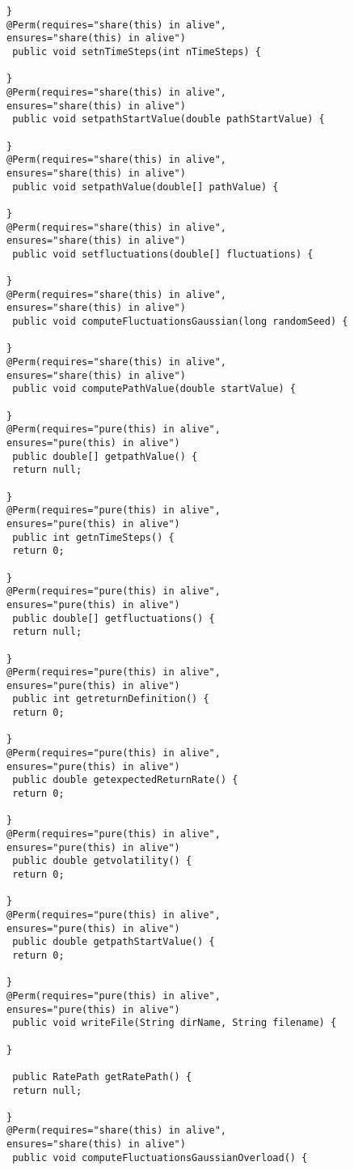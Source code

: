 \documentclass[10pt]{article}
\begin{document}
\begin{lstlisting}
} 
@Perm(requires="share(this) in alive",
ensures="share(this) in alive")
 public void setnTimeSteps(int nTimeSteps) {
 
} 
@Perm(requires="share(this) in alive",
ensures="share(this) in alive")
 public void setpathStartValue(double pathStartValue) {
 
} 
@Perm(requires="share(this) in alive",
ensures="share(this) in alive")
 public void setpathValue(double[] pathValue) {
 
} 
@Perm(requires="share(this) in alive",
ensures="share(this) in alive")
 public void setfluctuations(double[] fluctuations) {
 
} 
@Perm(requires="share(this) in alive",
ensures="share(this) in alive")
 public void computeFluctuationsGaussian(long randomSeed) {
 
} 
@Perm(requires="share(this) in alive",
ensures="share(this) in alive")
 public void computePathValue(double startValue) {
 
} 
@Perm(requires="pure(this) in alive",
ensures="pure(this) in alive")
 public double[] getpathValue() {
 return null;
 
} 
@Perm(requires="pure(this) in alive",
ensures="pure(this) in alive")
 public int getnTimeSteps() {
 return 0;
 
} 
@Perm(requires="pure(this) in alive",
ensures="pure(this) in alive")
 public double[] getfluctuations() {
 return null;
 
} 
@Perm(requires="pure(this) in alive",
ensures="pure(this) in alive")
 public int getreturnDefinition() {
 return 0;
 
} 
@Perm(requires="pure(this) in alive",
ensures="pure(this) in alive")
 public double getexpectedReturnRate() {
 return 0;
 
} 
@Perm(requires="pure(this) in alive",
ensures="pure(this) in alive")
 public double getvolatility() {
 return 0;
 
} 
@Perm(requires="pure(this) in alive",
ensures="pure(this) in alive")
 public double getpathStartValue() {
 return 0;
 
} 
@Perm(requires="pure(this) in alive",
ensures="pure(this) in alive")
 public void writeFile(String dirName, String filename) {
 
} 

 public RatePath getRatePath() {
 return null;
 
} 
@Perm(requires="share(this) in alive",
ensures="share(this) in alive")
 public void computeFluctuationsGaussianOverload() {
 

\end{lstlisting}
\end{document}
